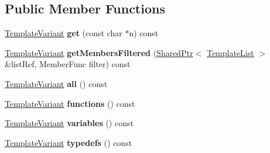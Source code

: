 \subsection*{Public Member Functions}
\begin{DoxyCompactItemize}
\item 
\mbox{\label{class_namespace_members_index_context_1_1_private_a6c196bd1a1364299cedcacf8aa630a08}} 
\mbox{\hyperlink{class_template_variant}{Template\+Variant}} {\bfseries get} (const char $\ast$n) const
\item 
\mbox{\label{class_namespace_members_index_context_1_1_private_a63f6dcf49c24a0a0b7808af23ff16c4c}} 
\mbox{\hyperlink{class_template_variant}{Template\+Variant}} {\bfseries get\+Members\+Filtered} (\mbox{\hyperlink{class_shared_ptr}{Shared\+Ptr}}$<$ \mbox{\hyperlink{class_template_list}{Template\+List}} $>$ \&list\+Ref, Member\+Func filter) const
\item 
\mbox{\label{class_namespace_members_index_context_1_1_private_a58a2bc85560e22258a27adfb191b988f}} 
\mbox{\hyperlink{class_template_variant}{Template\+Variant}} {\bfseries all} () const
\item 
\mbox{\label{class_namespace_members_index_context_1_1_private_a9a23d5c92e8b77e17b1b8fd84d26669b}} 
\mbox{\hyperlink{class_template_variant}{Template\+Variant}} {\bfseries functions} () const
\item 
\mbox{\label{class_namespace_members_index_context_1_1_private_a91257238616f6f5989b144f0196f2c65}} 
\mbox{\hyperlink{class_template_variant}{Template\+Variant}} {\bfseries variables} () const
\item 
\mbox{\label{class_namespace_members_index_context_1_1_private_a8a500c1cc7a35b1af98e8c2d0c7925b7}} 
\mbox{\hyperlink{class_template_variant}{Template\+Variant}} {\bfseries typedefs} () const
\item 
\mbox{\label{class_namespace_members_index_context_1_1_private_a968a800d0ed033a28349cd40b9a4fa4c}} 

\end{DoxyCompactItemize}
